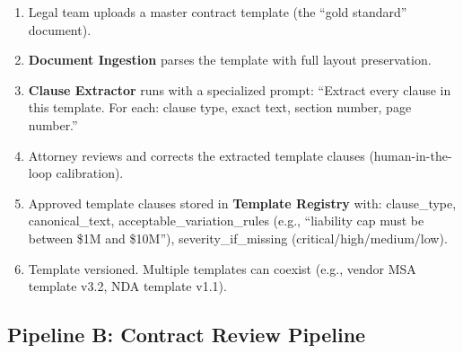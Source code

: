 \begin{enumerate}
  \item Legal team uploads a master contract template (the ``gold standard'' document).
  \item \textbf{Document Ingestion} parses the template with full layout preservation.
  \item \textbf{Clause Extractor} runs with a specialized prompt: ``Extract every clause in this template. For each: clause type, exact text, section number, page number.''
  \item Attorney reviews and corrects the extracted template clauses (human-in-the-loop calibration).
  \item Approved template clauses stored in \textbf{Template Registry} with: clause\_type, canonical\_text, acceptable\_variation\_rules (e.g., ``liability cap must be between \$1M and \$10M''), severity\_if\_missing (critical/high/medium/low).
  \item Template versioned. Multiple templates can coexist (e.g., vendor MSA template v3.2, NDA template v1.1).
\end{enumerate}

\subsection*{Pipeline B: Contract Review Pipeline}


